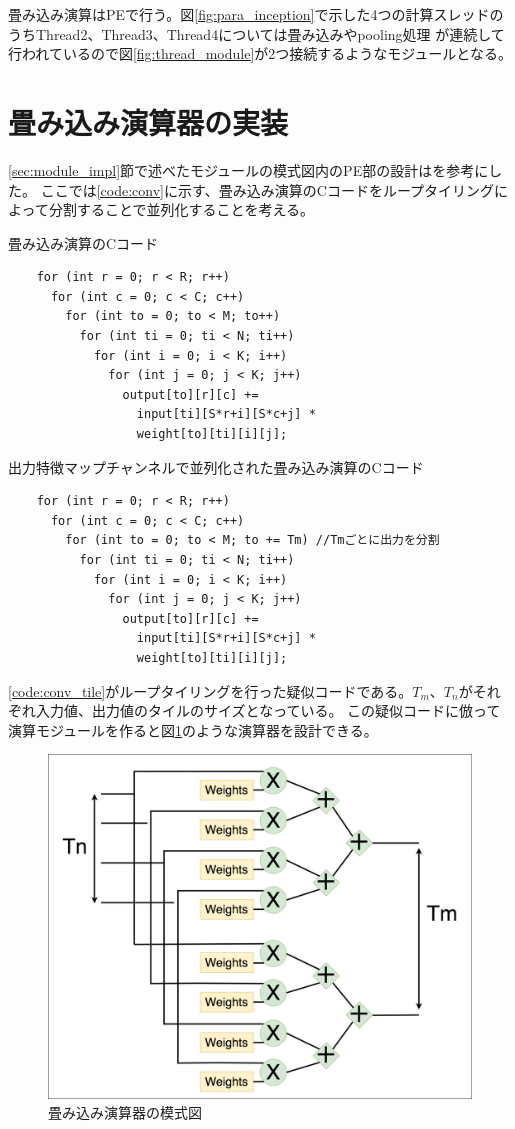 {畳み込み演算はPEで行う。図\ref{fig:para_inception}で示した4つの計算スレッドのうちThread2、Thread3、Thread4については畳み込みやpooling処理
が連続して行われているので図\ref{fig:thread_module}が2つ接続するようなモジュールとなる。

\section{畳み込み演算器の実装}
\label{sec:conv_impl}
\ref{sec:module_impl}節で述べたモジュールの模式図内のPE部の設計は\cite{optimized}を参考にした。
ここでは\ref{code:conv}に示す、畳み込み演算のCコードをループタイリングによって分割することで並列化することを考える。

\begin{itembox}[1]{畳み込み演算のCコード}
    \label{code:conv}
    \begin{verbatim}
    for (int r = 0; r < R; r++)
      for (int c = 0; c < C; c++)
        for (int to = 0; to < M; to++)
          for (int ti = 0; ti < N; ti++)
            for (int i = 0; i < K; i++)
              for (int j = 0; j < K; j++)
                output[to][r][c] +=
                  input[ti][S*r+i][S*c+j] *
                  weight[to][ti][i][j];
    \end{verbatim}
\end{itembox}

\begin{itembox}[1]{出力特徴マップチャンネルで並列化された畳み込み演算のCコード}
    \label{code:conv_tile}
    \begin{verbatim}
    for (int r = 0; r < R; r++)
      for (int c = 0; c < C; c++)
        for (int to = 0; to < M; to += Tm) //Tmごとに出力を分割
          for (int ti = 0; ti < N; ti++)
            for (int i = 0; i < K; i++)
              for (int j = 0; j < K; j++)
                output[to][r][c] +=
                  input[ti][S*r+i][S*c+j] *
                  weight[to][ti][i][j];
    \end{verbatim}
\end{itembox}

\ref{code:conv_tile}がループタイリングを行った疑似コードである。$T_m$、$T_n$がそれぞれ入力値、出力値のタイルのサイズとなっている。
この疑似コードに倣って演算モジュールを作ると図\ref{fig:conv_pe}のような演算器を設計できる。

\begin{figure}[h]
    \centering
    \includegraphics[width=12cm]{./chap6/fig/ucla_pe.png}
    \caption{畳み込み演算器の模式図}
    \label{fig:conv_pe}
\end{figure}
}

